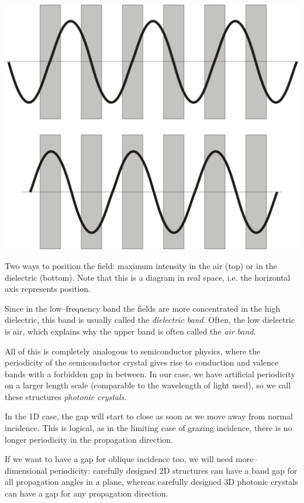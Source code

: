 \begin{marginfigure}
\centering
\includegraphics{symmetry/figures/field_placement}
\caption{Two ways to position the field: maximum intensity in the air (top) or in the dielectric (bottom). Note that this is a diagram in real space, i.e. the horizontal axis represents position.}
\label{fig-field-placement}
\end{marginfigure}

Since in the low--frequency band the fields are more concentrated in the high dielectric, this band is usually called the \emph{dielectric band}. Often, the low dielectric is air, which explains why the upper band is often called the \emph{air band}.

All of this is completely analogous to semiconductor physics, where the periodicity of the semiconductor crystal gives rise to conduction and valence bands with a forbidden gap in between. In our case, we have artificial periodicity on a larger length scale (comparable to the wavelength of light used), so we call these structures \emph{photonic crystals}.

In the 1D case, the gap will start to close as soon as we move away from normal incidence. This is logical, as in the limiting case of grazing incidence, there is no longer periodicity in the propagation direction.

If we want to have a gap for oblique incidence too, we will need more--dimensional periodicity: carefully designed 2D structures can have a band gap for all propagation angles in a plane, whereas carefully designed 3D photonic crystals can have a gap for any propagation direction.

